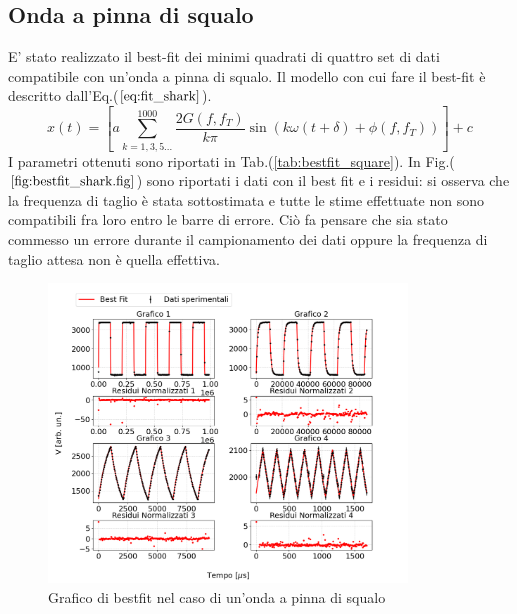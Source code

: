 \documentclass{article}
\begin{document}
    \subsection{Onda a pinna di squalo}
        E' stato realizzato il best-fit dei minimi quadrati
        di quattro set di dati compatibile con un'onda a pinna di squalo.
        Il modello con cui fare il best-fit è descritto dall'Eq.($\ref{eq:fit_shark}$).
                \begin{equation}
                    x(t) = \left[a\sum_{k=1,3,5...}^{1000} \frac{2G(f,f_T)}{k\pi}\sin\left(k\omega (t+\delta)+\phi(f,f_T)\right)\right] +c
                    \label{eq:fit_shark}
                \end{equation} 
        I parametri ottenuti sono riportati in Tab.(\ref{tab:bestfit_square}).%
        In Fig.($\ref{fig:bestfit_shark.fig}$) sono riportati i dati con il best fit e 
        i residui: si osserva che la frequenza di taglio è stata sottostimata e tutte le stime effettuate
        non sono compatibili fra loro entro le barre di errore. Ciò fa pensare che sia stato commesso un errore
        durante il campionamento dei dati oppure la frequenza di taglio attesa non è quella effettiva.

                \begin{figure}[H]
                    \centering
                    \includegraphics[width=0.85\textwidth]{bestfit_sharkfins.png} %
                    \caption{Grafico di bestfit nel caso di un'onda a pinna di squalo
                    }
                    \label{fig:bestfit_shark.fig}
                \end{figure}     
\end{document}
